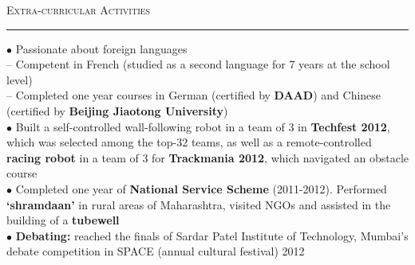\documentclass[a4paper,9pt]{article}
\begin{document}
\large{\textsc{Extra-curricular Activities}}\vspace{1.5pt}
\hrule\vspace{0.25cm}
\small
$\bullet$ Passionate about foreign languages\\
-- Competent in French (studied as a second language for 7 years at the school level)\\
-- Completed one year courses in German (certified by \textbf{DAAD}) and Chinese (certified by \textbf{Beijing Jiaotong University})\\
$\bullet$ Built a self-controlled wall-following robot in a team of 3 in \textbf{Techfest 2012}, which was selected among the top-32 teams, as well as a remote-controlled \textbf{racing robot} in a team of 3 for \textbf{Trackmania 2012}, which navigated an obstacle course\\
$\bullet$ Completed one year of \textbf{National Service Scheme} (2011-2012). Performed \textbf{‘shramdaan’} in rural areas of Maharashtra, visited NGOs and assisted in the building of a \textbf{tubewell}\\
$\bullet$ \textbf{Debating:} reached the finals of Sardar Patel Institute of Technology, Mumbai's debate competition in SPACE (annual cultural festival) 2012
\end{document}
